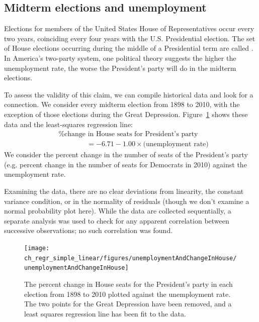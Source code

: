 \subsection{Midterm elections and unemployment}


Elections for members of the United States House of Representatives occur every two years, coinciding every four years with the U.S. Presidential election. The set of House elections occurring during the middle of a Presidential term are called . In America's two-party system, one political theory suggests the higher the unemployment rate, the worse the President's party will do in the midterm elections.

To assess the validity of this claim, we can compile historical data and look for a connection. We consider every midterm election from 1898 to 2010, with the exception of those elections during the Great Depression. Figure~\ref{unemploymentAndChangeInHouse} shows these data and the least-squares regression line: \vspace{-2mm}
\begin{align*}
&\text{\% change in House seats for President's party}  \\
&\qquad\qquad= -6.71 - 1.00\times \text{(unemployment rate)}
\end{align*}
We consider the percent change in the number of seats of the President's party (e.g. percent change in the number of seats for Democrats in 2010) against the unemployment rate.

Examining the data, there are no clear deviations from linearity, the constant variance condition, or in the normality of residuals (though we don't examine a normal probability plot here). While the data are collected sequentially, a separate analysis was used to check for any apparent correlation between successive observations; no such correlation was found.

\begin{figure}
\centering
\texttt{[image: ch\_regr\_simple\_linear/figures/unemploymentAndChangeInHouse/unemploymentAndChangeInHouse]}
\caption{The percent change in House seats for the President's party in each election from 1898 to 2010 plotted against the unemployment rate. The two points for the Great Depression have been removed, and a least squares regression line has been fit to the data.}
\label{unemploymentAndChangeInHouse}
\end{figure}

